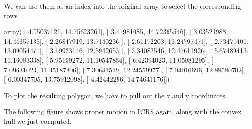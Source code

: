 \documentclass[letterpaper,10pt,english]{sphinxmanual}
\begin{document}
We can use them as an index into the original array to select the corresponding rows.

\begin{sphinxVerbatim}[commandchars=\\\{\}]
  \PYG{p}{[}\PYG{p}{]}
\end{sphinxVerbatim}

\begin{sphinxVerbatim}[commandchars=\\\{\}]
array([[ \PYGZhy{}4.05037121, \PYGZhy{}14.75623261],
       [ \PYGZhy{}3.41981085, \PYGZhy{}14.72365546],
       [ \PYGZhy{}3.03521988, \PYGZhy{}14.44357135],
       [ \PYGZhy{}2.26847919, \PYGZhy{}13.7140236 ],
       [ \PYGZhy{}2.61172203, \PYGZhy{}13.24797471],
       [ \PYGZhy{}2.73471401, \PYGZhy{}13.09054471],
       [ \PYGZhy{}3.19923146, \PYGZhy{}12.5942653 ],
       [ \PYGZhy{}3.34082546, \PYGZhy{}12.47611926],
       [ \PYGZhy{}5.67489413, \PYGZhy{}11.16083338],
       [ \PYGZhy{}5.95159272, \PYGZhy{}11.10547884],
       [ \PYGZhy{}6.42394023, \PYGZhy{}11.05981295],
       [ \PYGZhy{}7.09631023, \PYGZhy{}11.95187806],
       [ \PYGZhy{}7.30641519, \PYGZhy{}12.24559977],
       [ \PYGZhy{}7.04016696, \PYGZhy{}12.88580702],
       [ \PYGZhy{}6.00347705, \PYGZhy{}13.75912098],
       [ \PYGZhy{}4.42442296, \PYGZhy{}14.74641176]])
\end{sphinxVerbatim}

To plot the resulting polygon, we have to pull out the x and y coordinates.

\begin{sphinxVerbatim}[commandchars=\\\{\}]
   
\end{sphinxVerbatim}

The following figure shows proper motion in ICRS again, along with the convex hull we just computed.
\end{document}
